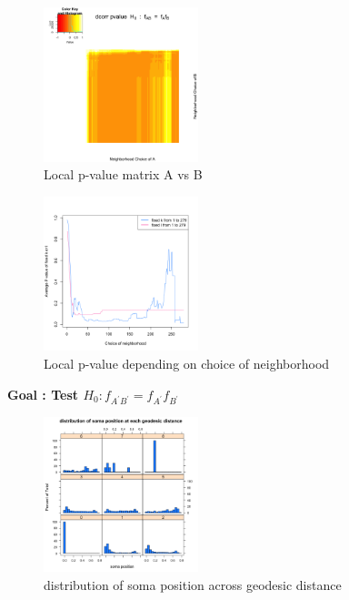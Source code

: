 \documentclass[12pt]{report}
\begin{document}
\begin{figure}[H]
\captionsetup{format=plain}
\centering
\includegraphics[width=0.4\textwidth]{../figure/P_A_B.png}
\caption{Local p-value matrix A vs B}
\label{fig:PAB}
\end{figure}


\begin{figure}[H]
\captionsetup{format=plain}
\centering
\includegraphics[width=0.4\textwidth]{../figure/AB_hist.png}
\caption{Local p-value depending on choice of neighborhood}
\label{fig:ABhist}
\end{figure}


\newpage
\begin{center}\textbf{Goal : Test $H_{0} : f_{A^\prime B^\prime} = f_{A^\prime}f_{B^\prime}$}
\end{center} 

\begin{figure}[H]
\captionsetup{format=plain}
\centering
\includegraphics[width=0.4\textwidth]{../figure/histo2.png}
\caption{distribution of soma position across geodesic distance}
\label{fig:histo1}
\end{figure}  
 
\end{document}
